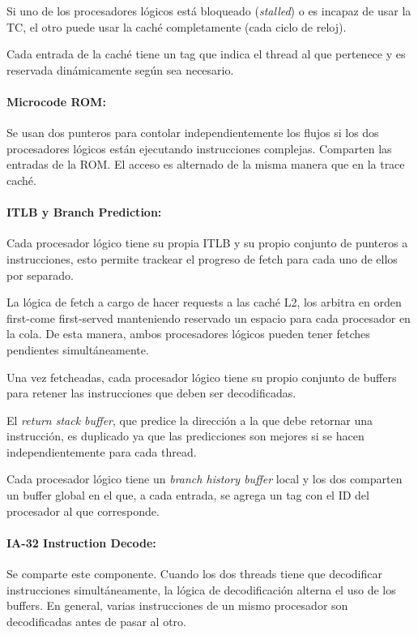 Si uno de los procesadores lógicos está bloqueado (\textit{stalled}) o es incapaz de usar la TC, el otro puede usar la caché completamente (cada ciclo de reloj).

Cada entrada de la caché tiene un tag que indica el thread al que pertenece y es reservada dinámicamente según sea necesario.

\paragraph{Microcode ROM:} Se usan dos punteros para contolar independientemente los flujos si los dos procesadores lógicos están ejecutando instrucciones complejas. Comparten las entradas de la ROM. El acceso es alternado de la misma manera que en la trace caché.

\paragraph{ITLB y Branch Prediction:} Cada procesador lógico tiene su propia ITLB y su propio conjunto de punteros a instrucciones, esto permite trackear el progreso de fetch para cada uno de ellos por separado.

La lógica de fetch a cargo de hacer requests a las caché L2, los arbitra en orden first-come first-served manteniendo reservado un espacio para cada procesador en la cola. De esta manera, ambos procesadores lógicos pueden tener fetches pendientes simultáneamente. 

Una vez fetcheadas, cada procesador lógico tiene su propio conjunto de buffers para retener las instrucciones que deben ser decodificadas.

El \textit{return stack buffer}, que predice la dirección a la que debe retornar una instrucción, es duplicado ya que las predicciones son mejores si se hacen independientemente para cada thread.

Cada procesador lógico tiene un \textit{branch history buffer} local y los dos comparten un buffer global en el que, a cada entrada, se agrega un tag con el ID del procesador al que corresponde.

\paragraph{IA-32 Instruction Decode: } Se comparte este componente. Cuando los dos threads tiene que decodificar instrucciones simultáneamente, la lógica de decodificación alterna el uso de los buffers. En general, varias instrucciones de un mismo procesador son decodificadas antes de pasar al otro.

